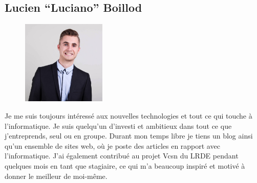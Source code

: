  \subsection{Lucien ``Luciano'' Boillod}
  \begin{figure}
  \vspace{-7mm}
  \includegraphics[width=4cm]{lucien.png}
  \end{figure}
 Je me suis toujours intéressé aux nouvelles technologies et tout ce qui
 touche à
 l'informatique. Je suis quelqu'un d'investi et ambitieux dans tout ce que
 j'entreprends, seul ou en groupe. Durant mon temps libre je tiens un blog
 ainsi
 qu’un ensemble de sites web, où je poste des articles en rapport avec
 l’informatique. J’ai également contribué au projet Vcsn du LRDE pendant
 quelques
 mois en tant que stagiaire, ce qui m’a beaucoup inspiré et motivé à donner le
 meilleur de moi-même.
